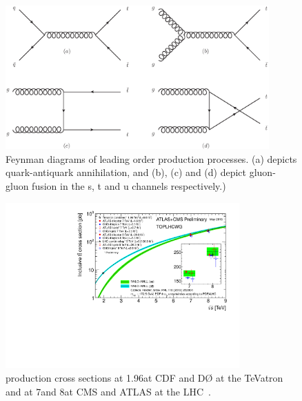\begin{figure}[hbtp]
   \centering
     \includegraphics[width=0.9\textwidth]{Chapters/03_Theory/Images/ttbar_production}\hfill
     \caption[Feynman diagrams of leading order \ttbar production processes.]{Feynman diagrams of leading
     order \ttbar production processes. (a) depicts quark-antiquark annihilation, and (b), (c) and (d) depict
     gluon-gluon fusion in the s, t and u channels respectively.)}
     \label{fig:ttbar_production}
\end{figure}

\begin{figure}[hbtp]
   \centering
     \includegraphics[width=0.8\textwidth]{Chapters/03_Theory/Images/toplhcwg_ttxsec_sqrts_may2015}\hfill
     \caption[\ttbar production cross sections at 1.96\TeV at CDF and D{\O} at the TeVatron and at 7\TeV and
     8\TeV at CMS and ATLAS at the LHC.]{\ttbar production cross sections at 1.96\TeV at CDF and D{\O} at the
     TeVatron and at 7\TeV and 8\TeV at CMS and ATLAS at the LHC~\cite{TOPLHC_WG}.}
     \label{fig:ttbar_cross_sections_plot}
\end{figure}



